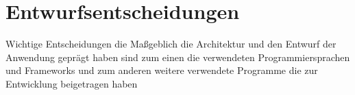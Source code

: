 \chapter{Entwurfsentscheidungen}
Wichtige Entscheidungen die Maßgeblich die Architektur und den Entwurf der Anwendung geprägt haben sind zum einen die verwendeten Programmiersprachen und Frameworks und zum anderen weitere verwendete Programme die zur Entwicklung beigetragen haben
